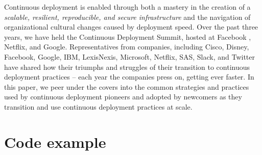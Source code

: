 \documentclass[manuscript, review, screen]{acmart}
\begin{document}
Continuous deployment is enabled through both a mastery in the creation of a \emph{scalable, resilient, reproducible, and secure infrastructure} and the navigation of organizational cultural changes caused by deployment speed.  Over the past three years, we have held the Continuous Deployment Summit, hosted at Facebook \cite{parnin2016top}, Netflix, and Google. Representatives from companies, including Cisco, Disney, Facebook, Google, IBM, LexisNexis, Microsoft, Netflix, SAS, Slack, and Twitter have shared how their triumphs and struggles of their transition to continuous deployment practices -- each year the companies press on, getting ever faster. In this paper, we peer under the covers into the common strategies and practices used by continuous deployment pioneers and adopted by newcomers as they transition and use continuous deployment practices at scale.  

\section{Code example}
\end{document}
